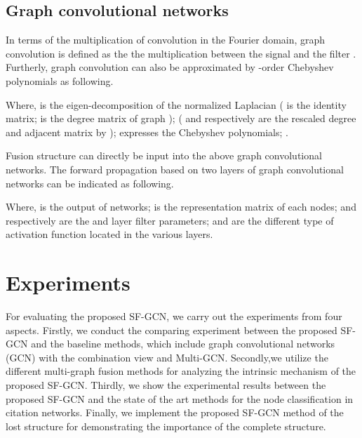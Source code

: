 \documentclass[review]{elsarticle}
\begin{document}
\subsection{Graph convolutional networks}
In terms of the multiplication of convolution in the Fourier domain, graph convolution is defined as the the multiplication between the signal  and the filter \cite{bruna2013spectral}. Furtherly, graph convolution can also be approximated by -order Chebyshev polynomials \cite{kipf2016semi} as following.


Where,  is the eigen-decomposition of the normalized Laplacian ( is the identity matrix;  is the degree matrix of graph );  ( and  respectively are the rescaled degree and adjacent matrix  by );  expresses the Chebyshev polynomials; .

Fusion structure  can directly be input into the above graph convolutional networks. The forward propagation based on two layers of graph convolutional networks can be indicated as following.

Where,  is the output of networks; is the representation matrix of each nodes; and  respectively are the  and  layer filter parameters;  and  are the different type of activation function located in the various layers.

\section{Experiments}
For evaluating the proposed SF-GCN, we carry out the experiments from four aspects. Firstly, we conduct the comparing experiment between the proposed SF-GCN and the baseline methods, which include graph convolutional networks (GCN)\cite{kipf2016semi} with the combination view and Multi-GCN\cite{khan2019multi}. Secondly,we utilize the different multi-graph fusion methods for analyzing the intrinsic mechanism of the proposed SF-GCN. Thirdly, we show the experimental results between the proposed SF-GCN and the state of the art methods for the node classification in citation networks. Finally, we implement the proposed SF-GCN method of the lost structure for demonstrating the importance of the complete structure.
\end{document}
